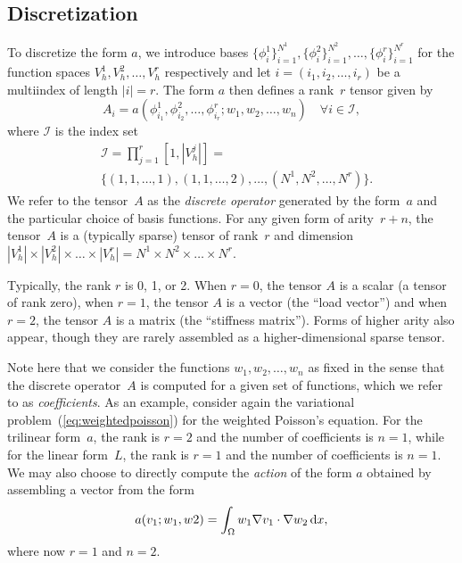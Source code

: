 \subsection{Discretization}
\label{sec:Discretization}

To discretize the form $a$, we introduce bases
$\{\phi_i^1\}_{i=1}^{N^1},
 \{\phi_i^2\}_{i=1}^{N^2}, \ldots,
 \{\phi_i^r\}_{i=1}^{N^r}$
for the function spaces $V_h^1, V_h^2, \ldots, V_h^r$ respectively and let $i =
(i_1, i_2, \ldots, i_r)$ be a multiindex of length $|i| = r$. The
form $a$ then defines a rank~$r$ tensor given by
\begin{equation} \label{eq:tensor}
  A_i = a(\phi_{i_1}^1, \phi_{i_2}^2, \ldots, \phi_{i_r}^r; w_1, w_2, \ldots, w_n)
  \quad \forall i \in \mathcal{I},
\end{equation}
where $\mathcal{I}$ is the index set
\begin{equation}
  \begin{split}
  & \mathcal{I} =  \prod_{j=1}^r[1,|V^j_h|] =  \\
  & \{(1,1,\ldots,1), (1,1,\ldots,2), \ldots,
  (N^1,N^2,\ldots,N^r)\}.
  \end{split}
\end{equation}
We refer to the tensor~$A$ as the \emph{discrete operator} generated
by the form~$a$ and the particular choice of basis functions.  For any
given form of arity~$r + n$, the tensor~$A$ is a (typically sparse)
tensor of rank~$r$ and dimension $|V_h^1| \times |V_h^2| \times \ldots
\times |V_h^r| = N^1 \times N^2 \times \ldots \times N^r$.

Typically, the rank $r$ is 0, 1, or 2. When $r = 0$, the
tensor $A$ is a scalar (a tensor of rank zero), when $r = 1$, the
tensor $A$ is a vector (the ``load vector'') and when $r = 2$, the
tensor $A$ is a matrix (the ``stiffness matrix''). Forms of higher
arity also appear, though they are rarely assembled as a
higher-dimensional sparse tensor.

Note here that we consider the functions $w_1, w_2, \ldots, w_n$ as
fixed in the sense that the discrete operator~$A$ is computed for a
given set of functions, which we refer to as \emph{coefficients}. As
an example, consider again the variational
problem~(\ref{eq:weightedpoisson}) for the weighted Poisson's
equation. For the trilinear form~$a$, the rank is $r = 2$ and
the number of coefficients is $n = 1$, while for the linear form~$L$,
the rank is $r = 1$ and the number of coefficients is $n = 1$. We may
also choose to directly compute the \emph{action} of the form
$a$ obtained by assembling a vector from the form
\begin{equation}
  a(v_1; w_1, w2) = \int_{\Omega} w_1 \nabla v_1 \cdot \nabla w_2 \, \mathrm{d}x,
\end{equation}
where now $r = 1$ and $n = 2$.

